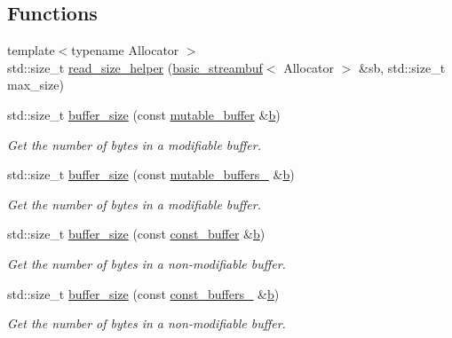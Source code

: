 \subsection*{Functions}
\begin{DoxyCompactItemize}
\item 
{\footnotesize template$<$typename Allocator $>$ }\\std\+::size\+\_\+t \hyperlink{namespaceasio_a1cf92f0e55c9196057b27a1d35997824}{read\+\_\+size\+\_\+helper} (\hyperlink{classasio_1_1basic__streambuf}{basic\+\_\+streambuf}$<$ Allocator $>$ \&sb, std\+::size\+\_\+t max\+\_\+size)
\item 
std\+::size\+\_\+t \hyperlink{group__buffer__size_gabe8b5f116fbb66004b6d0ba8ee39c3d5}{buffer\+\_\+size} (const \hyperlink{classasio_1_1mutable__buffer}{mutable\+\_\+buffer} \&\hyperlink{group__async__read_ga945a5c18fa77a9e2eba420f8f44b2a4f}{b})
\begin{DoxyCompactList}\small\item\em Get the number of bytes in a modifiable buffer. \end{DoxyCompactList}\item 
std\+::size\+\_\+t \hyperlink{group__buffer__size_ga51568d795ef652942a495a95397617a6}{buffer\+\_\+size} (const \hyperlink{classasio_1_1mutable__buffers__1}{mutable\+\_\+buffers\+\_} \&\hyperlink{group__async__read_ga945a5c18fa77a9e2eba420f8f44b2a4f}{b})
\begin{DoxyCompactList}\small\item\em Get the number of bytes in a modifiable buffer. \end{DoxyCompactList}\item 
std\+::size\+\_\+t \hyperlink{group__buffer__size_ga41d80aa96b2589938b695deb42eda2c7}{buffer\+\_\+size} (const \hyperlink{classasio_1_1const__buffer}{const\+\_\+buffer} \&\hyperlink{group__async__read_ga945a5c18fa77a9e2eba420f8f44b2a4f}{b})
\begin{DoxyCompactList}\small\item\em Get the number of bytes in a non-\/modifiable buffer. \end{DoxyCompactList}\item 
std\+::size\+\_\+t \hyperlink{group__buffer__size_gab096963a970c5183e81c428e9d98a65f}{buffer\+\_\+size} (const \hyperlink{classasio_1_1const__buffers__1}{const\+\_\+buffers\+\_} \&\hyperlink{group__async__read_ga945a5c18fa77a9e2eba420f8f44b2a4f}{b})
\begin{DoxyCompactList}\small\item\em Get the number of bytes in a non-\/modifiable buffer. \end{DoxyCompactList}\item 

\end{DoxyCompactItemize}
